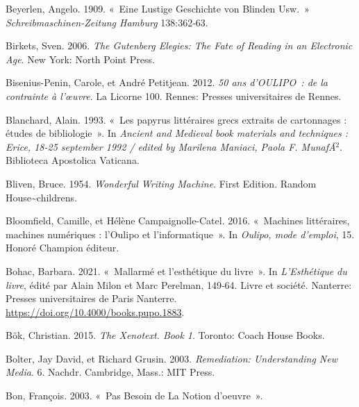 \begin{CSLReferences}{1}{0}
\leavevmode{}%
Beyerlen, Angelo. 1909. {«~Eine Lustige {Geschichte} von {Blinden}
Usw.~»} \emph{Schreibmaschinen-Zeitung Hamburg} 138:362‑63.

\leavevmode{}%
Birkets, Sven. 2006. \emph{{The Gutenberg Elegies: The Fate of Reading
in an Electronic Age}}. {New York}: {North Point Press}.

\leavevmode{}%
Bisenius-Penin, Carole, et André Petitjean. 2012. \emph{{50 ans
d'OULIPO~: de la contrainte {à} l'{œ}uvre}}. {La Licorne} 100. {Rennes}:
{Presses universitaires de Rennes}.

\leavevmode{}%
Blanchard, Alain. 1993. {«~{Les papyrus litt{é}raires grecs extraits de
cartonnages : {é}tudes de bibliologie}~»}. In \emph{{Ancient and
Medieval book materials and techniques : Erice, 18-25 september 1992 /
edited by Marilena Maniaci, Paola F. Munaf{Ã}{\(^{2}\)}}}. {Biblioteca
Apostolica Vaticana}.

\leavevmode{}%
Bliven, Bruce. 1954. \emph{{Wonderful Writing Machine}}. First Edition.
{Random House{\textasciitilde{}}childrens}.

\leavevmode{}%
Bloomfield, Camille, et Hélène Campaignolle-Catel. 2016. {«~{Machines
litt{é}raires, machines num{é}riques : l'Oulipo et l'informatique}~»}.
In \emph{{Oulipo, mode d'emploi}}, 15. {Honor{é} Champion {é}diteur}.

\leavevmode{}%
Bohac, Barbara. 2021. {«~{Mallarm{é} et l'esth{é}tique du livre}~»}. In
\emph{{L'Esth{é}tique du livre}}, édité par Alain Milon et Marc
Perelman, 149‑64. {Livre et soci{é}t{é}}. {Nanterre}: {Presses
universitaires de Paris Nanterre}.
\url{https://doi.org/10.4000/books.pupo.1883}.

\leavevmode{}%
Bök, Christian. 2015. \emph{The Xenotext. {Book} 1}. {Toronto}: {Coach
House Books}.

\leavevmode{}%
Bolter, Jay David, et Richard Grusin. 2003. \emph{Remediation:
{Understanding New Media}}. 6. Nachdr. {Cambridge, Mass.}: {MIT Press}.

\leavevmode{}%
Bon, François. 2003. {«~Pas Besoin de La Notion d'oeuvre~»}.


\end{CSLReferences}
